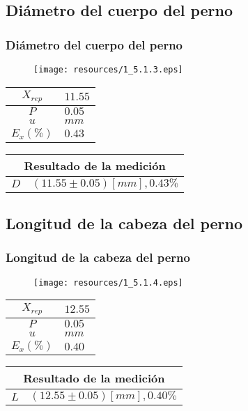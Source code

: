 \documentclass[letter,11pt]{beamer}
\begin{document}
\subsection{Diámetro del cuerpo del perno}
\begin{frame}
\frametitle{Diámetro del cuerpo del perno}
\vspace*{0.8cm}
\begin{figure}
\centering
\texttt{[image: resources/1\_5.1.3.eps]}
\end{figure}
\vspace*{0.4cm}
\scriptsize
\begin{tabular}{|c|>{\centering}m{1.8cm}<{\centering}|}
\hline
$X_{rep}$ &  $11.55$ \tabularnewline \hline
      $P$ &   $0.05$ \tabularnewline \hline
      $u$ &     $mm$ \tabularnewline \hline
$E_x(\%)$ &   $0.43$ \tabularnewline \hline
\end{tabular}
\quad
\begin{tabular}{|c|>{\centering}m{5.7cm}<{\centering}|}
\hline
\multicolumn{2}{|c|}{\textbf{Resultado de la medición}} \\ \hline
$D$ & $( 11.55\pm0.05)[mm], 0.43\%$ \tabularnewline \hline
\end{tabular}
\end{frame}

\subsection{Longitud de la cabeza del perno}
\begin{frame}
\frametitle{Longitud de la cabeza del perno}
\vspace*{0.8cm}
\begin{figure}
\centering
\texttt{[image: resources/1\_5.1.4.eps]}
\end{figure}
\vspace*{0.4cm}
\scriptsize
\begin{tabular}{|c|>{\centering}m{1.8cm}<{\centering}|}
\hline
$X_{rep}$ &  $12.55$ \tabularnewline \hline
      $P$ &   $0.05$ \tabularnewline \hline
      $u$ &     $mm$ \tabularnewline \hline
$E_x(\%)$ &   $0.40$ \tabularnewline \hline
\end{tabular}
\quad
\begin{tabular}{|c|>{\centering}m{5.7cm}<{\centering}|}
\hline
\multicolumn{2}{|c|}{\textbf{Resultado de la medición}} \\ \hline
$L$ & $( 12.55\pm0.05)[mm], 0.40\%$ \tabularnewline \hline
\end{tabular}
\end{frame}
\end{document}
